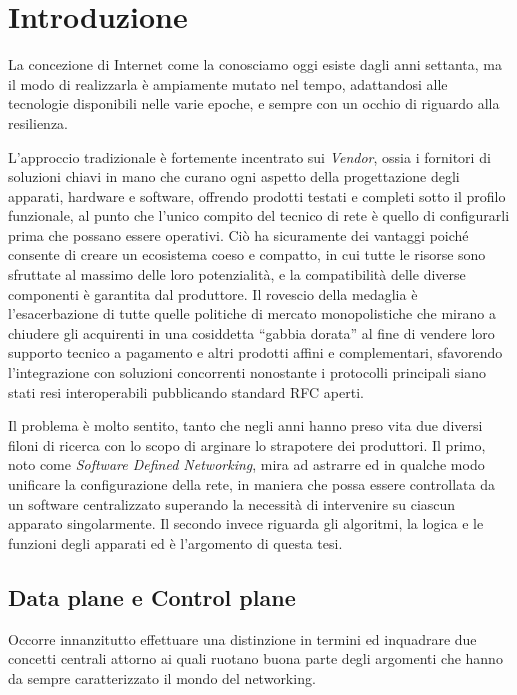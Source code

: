 \chapter{Introduzione}
\label{chap:intro}


La concezione di Internet come la conosciamo oggi esiste dagli anni settanta, ma il modo di realizzarla è ampiamente mutato nel tempo, adattandosi alle tecnologie disponibili nelle varie epoche, e sempre con un occhio di riguardo alla resilienza.

L'approccio tradizionale è fortemente incentrato sui \textit{Vendor}, ossia i fornitori di soluzioni chiavi in mano che curano ogni aspetto della progettazione degli apparati, hardware e software, offrendo prodotti testati e completi sotto il profilo funzionale, al punto che l'unico compito del tecnico di rete è quello di configurarli prima che possano essere operativi. Ciò ha sicuramente dei vantaggi poiché consente di creare un ecosistema coeso e compatto, in cui tutte le risorse sono sfruttate al massimo delle loro potenzialità, e la compatibilità delle diverse componenti è garantita dal produttore. Il rovescio della medaglia è l'esacerbazione di tutte quelle politiche di mercato monopolistiche che mirano a chiudere gli acquirenti in una cosiddetta ``gabbia dorata'' al fine di vendere loro supporto tecnico a pagamento e altri prodotti affini e complementari, sfavorendo l'integrazione con soluzioni concorrenti nonostante i protocolli principali siano stati resi interoperabili pubblicando standard RFC aperti.

Il problema è molto sentito, tanto che negli anni hanno preso vita due diversi filoni di ricerca con lo scopo di arginare lo strapotere dei produttori. Il primo, noto come \textit{Software Defined Networking}, mira ad astrarre ed in qualche modo unificare la configurazione della rete, in maniera che possa essere controllata da un software centralizzato superando la necessità di intervenire su ciascun apparato singolarmente. Il secondo invece riguarda gli algoritmi, la logica e le funzioni degli apparati ed è l'argomento di questa tesi.

\section{Data plane e Control plane}

Occorre innanzitutto effettuare una distinzione in termini ed inquadrare due concetti centrali attorno ai quali ruotano buona parte degli argomenti che hanno da sempre caratterizzato il mondo del networking.

